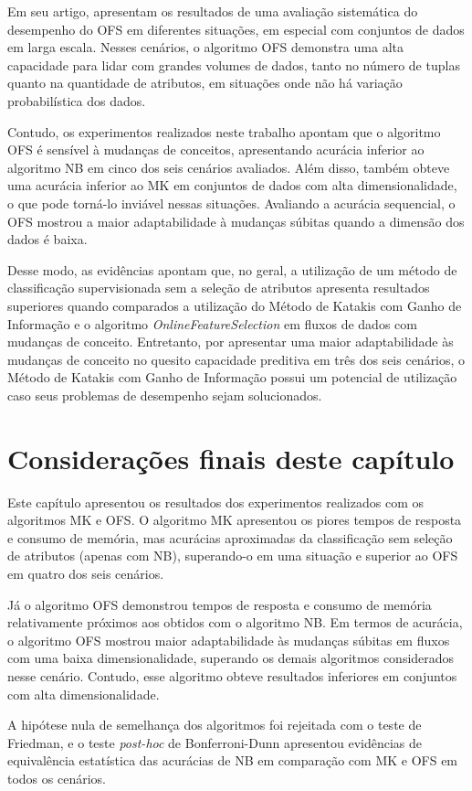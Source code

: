 Em seu artigo,  apresentam os resultados de uma avaliação sistemática do desempenho do OFS em diferentes situações, em especial com conjuntos de dados em larga escala. Nesses cenários, o algoritmo OFS demonstra uma alta capacidade para lidar com grandes volumes de dados, tanto no número de tuplas quanto na quantidade de atributos, em situações onde não há variação probabilística dos dados. 

Contudo, os experimentos realizados neste trabalho apontam que o algoritmo OFS é sensível à mudanças de conceitos, apresentando acurácia inferior ao algoritmo NB em cinco dos seis cenários avaliados. Além disso, também obteve uma acurácia inferior ao MK em conjuntos de dados com alta dimensionalidade, o que pode torná-lo inviável nessas situações. Avaliando a acurácia sequencial, o OFS mostrou a maior adaptabilidade à mudanças súbitas quando a dimensão dos dados é baixa. 

Desse modo, as evidências apontam que, no geral,  a utilização de um método de classificação supervisionada sem a seleção de atributos apresenta resultados superiores quando comparados a utilização do Método de Katakis com Ganho de Informação e o algoritmo \textit{OnlineFeatureSelection} em fluxos de dados com mudanças de conceito. Entretanto, por apresentar uma maior adaptabilidade às mudanças de conceito no quesito capacidade preditiva em três dos seis cenários, o Método de Katakis com Ganho de Informação possui um potencial de utilização caso seus problemas de desempenho sejam solucionados.


\section{Considerações finais deste capítulo}\label{sec:res_consideracoes} 

Este capítulo apresentou os resultados dos experimentos realizados com os algoritmos MK e OFS. O algoritmo MK apresentou os piores tempos de resposta e consumo de memória, mas acurácias aproximadas da classificação sem seleção de atributos (apenas com NB), superando-o em uma situação e superior ao OFS em quatro dos seis cenários. 

Já o algoritmo OFS demonstrou tempos de resposta e consumo de memória relativamente próximos aos obtidos com o algoritmo NB. Em termos de acurácia, o algoritmo OFS mostrou maior adaptabilidade às mudanças súbitas em fluxos com uma baixa dimensionalidade, superando os demais algoritmos considerados nesse cenário. Contudo, esse algoritmo obteve resultados inferiores em conjuntos com alta dimensionalidade.

A hipótese nula de semelhança dos algoritmos foi rejeitada com o teste de Friedman, e o teste \textit{post-hoc} de Bonferroni-Dunn apresentou evidências de equivalência estatística das acurácias de NB em comparação com MK e OFS em todos os cenários. 